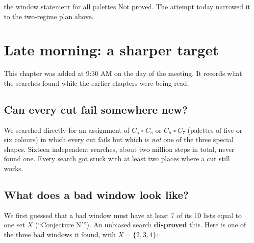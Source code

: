 \documentclass[11pt,oneside,openany]{book}
\newcommand{\T}{\mathbin{\square}}
\begin{document}
\begin{openitem}{the window statement for all palettes}
Not proved. The attempt today narrowed it to the two-regime plan above.
\end{openitem}

\chapter{Late morning: a sharper target}

This chapter was added at 9:30 AM on the day of the meeting. It records what the searches found
while the earlier chapters were being read.

\section{Can every cut fail somewhere new?}

We searched directly for an assignment of $C_5 \T C_5$ or $C_5 \T C_7$ (palettes of five or six colours) in
which every cut fails but which is \emph{not} one of the three special shapes. Sixteen independent
searches, about two million steps in total, never found one. Every search got stuck with at least
two places where a cut still works.

\section{What does a bad window look like?}

We first guessed that a bad window must have at least 7 of its 10 lists equal to one set $X$
(``Conjecture N$'$''). An unbiased search \textbf{disproved} this. Here is one of the three bad
windows it found, with $X = \{2,3,4\}$:

\begin{center}
\end{center}
\end{document}
